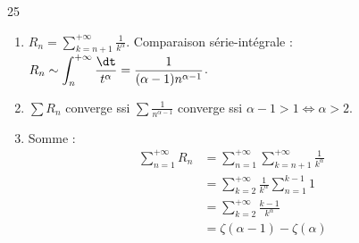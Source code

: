 \begin{correction}{25}
\begin{enumerate}
    \item 
        $\displaystyle R_n = \sum_{k=n+1}^{+\infty} \frac{1}{k^\alpha}$.
        Comparaison série-intégrale : $\displaystyle R_n \sim \int_n^{+\infty} \frac{\dt}{t^\alpha} = \frac{1}{(\alpha-1)n^{\alpha-1}}$.
        
    \item $\sum R_n$ converge ssi $\sum \frac{1}{n^{\alpha-1}}$ converge
        ssi $\alpha-1 > 1 \iff \alpha > 2$.

    \item Somme : 
        \begin{align*}
            \sum_{n=1}^{+\infty} R_n &= \sum_{n=1}^{+\infty} \sum_{k=n+1}^{+\infty} \frac{1}{k^\alpha} \\
                &= \sum_{k=2}^{+\infty} \frac{1}{k^\alpha} \sum_{n=1}^{k-1} 1 \\
                &= \sum_{k=2}^{+\infty} \frac{k-1}{k^\alpha} \\
                &= \zeta(\alpha-1) - \zeta(\alpha) &&
        \end{align*}
\end{enumerate}
\end{correction}


